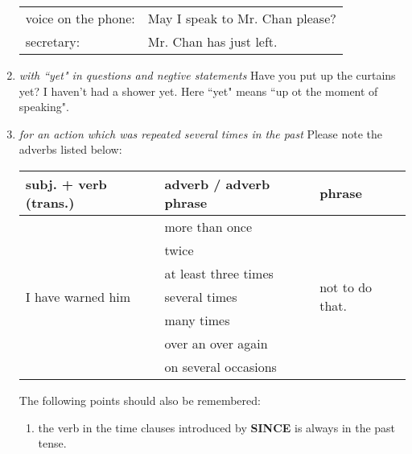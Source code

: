 \begin{enumerate}
\begin{tabular}{ll}
            voice on the phone: & May I speak to Mr. Chan please? \\
            secretary: & Mr. Chan has just left.
        \end{tabular}
    \item {\it with ``yet" in questions and negtive statements}
        \newline
        \newline
        Have you put up the curtains yet?
        \newline
        \newline
        I haven't had a shower yet.
        \newline
        \newline
        Here ``yet" means ``up ot the moment of speaking".
    \item {\it for an action which was repeated several times in the past}
        \newline
        \newline
        Please note the adverbs listed below:
        \newline
        \newline
        \begin{tabular}{|l|l|l|}
            \hline
            subj. + verb (trans.) & adverb / adverb phrase & phrase \\
            \hline
            \multirow{7}{*}{I have warned him}
            & more than once
            & \multirow{7}{*}{not to do that.} \\
            & twice & \\
            & at least three times & \\
            & several times & \\
            & many times & \\
            & over an over again & \\
            & on several occasions & \\ \hline
        \end{tabular}
        \newline
        \newline
        The following points should also be remembered:
        \begin{enumerate}
            \item the verb in the time clauses introduced by \textbf{SINCE} is
                always in the past tense.
                \newline
                \newline

\end{enumerate}
\end{enumerate}
